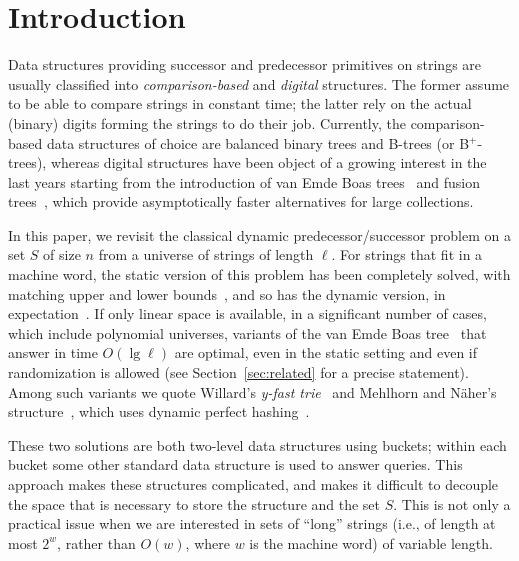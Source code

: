 \documentclass[a4paper]{article}
\newcommand{\?}{\mskip1.5mu}
\begin{document}
\section{Introduction}

Data structures providing successor and predecessor primitives on strings are
usually classified into \emph{comparison-based} and \emph{digital} structures. The former
assume to be able to compare strings in constant time; the latter rely on the
actual (binary) digits forming the strings to do their job. Currently, the
comparison-based data structures of choice are balanced binary trees and B-trees (or B$^+$-trees), whereas
digital structures have been object of a growing interest in the last years
starting from the introduction of van Emde Boas trees~\cite{EKZDIEPQ} and
fusion trees~\cite{FrWSITBFT}, which provide asymptotically faster alternatives
for large collections.

In this paper, we revisit the classical dynamic predecessor/successor problem on a
set $S$ of size $n$ from a universe of strings of length $\ell$. For strings
that fit in a machine word, the static
version of this problem has been completely solved, with matching upper and
lower bounds~\cite{Patrascu2006Timespace,PaTRDNHSP}, and so has the dynamic version, 
in expectation~\cite{Patrascu2014Dynamic}. If only linear space is available, in a significant
number of cases, which include polynomial universes, 
variants of the van Emde Boas tree~\cite{EKZDIEPQ} that answer in time $O(\lg\ell)$ are
optimal, even in the static setting and even if randomization is allowed (see Section~\ref{sec:related} for a precise statement). 
Among such variants we
quote Willard's \emph{y-fast trie}~\cite{WilLLWRQ} and Mehlhorn and N\"aher's
structure~\cite{MeNBOD}, which uses dynamic perfect hashing~\cite{DKMDPHULB}. 

These two solutions are both two-level data structures using buckets;
within each bucket some other standard data structure is used to answer queries. This
approach makes these structures complicated, and makes it difficult to
decouple the space that is necessary to store the structure and the set $S$.
This is not only a practical issue when we are interested in sets of ``long''
strings (i.e., of length at most $2^w$, rather than $O(w)$, where $w$ is the
machine word) of variable length. 

\end{document}
